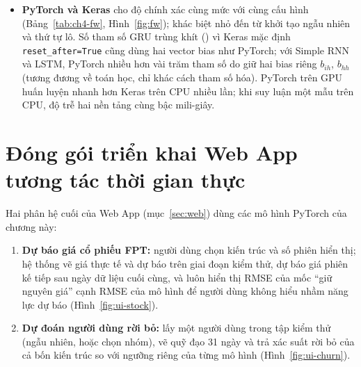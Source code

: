 \begin{itemize}
    (Bảng~\ref{tab:ch4-churn}); GRU tốt nhất với ROC-AUC  và AP , so với
     và  của Simple RNN (Hình~\ref{fig:roc-churn}). Mức tuyệt đối vẫn
    thấp: chỉ từ nhật ký nghe nhạc, người ở lại và người rời bỏ chồng lấn mạnh, đúng như EDA đã cảnh báo. Phân bố xác suất
    (Hình~\ref{fig:prob-churn}) cho thấy xác suất của nhóm rời bỏ chỉ dịch nhẹ sang phải so với nhóm ở lại. Ở ngưỡng tối ưu F1,
    mô hình chỉ bắt được khoảng một phần ba số người rời bỏ (Recall LSTM ) mà vẫn kèm nhiều báo
    động giả (Hình~\ref{fig:cm-churn}); nếu dùng để giữ chân khách hàng, danh sách xếp hạng theo xác suất hữu ích hơn một nhãn cứng.
  \item \textbf{PyTorch và Keras} cho độ chính xác cùng mức với cùng cấu hình (Bảng~\ref{tab:ch4-fw}, Hình~\ref{fig:fw});
    khác biệt nhỏ đến từ khởi tạo ngẫu nhiên và thứ tự lô. Số tham số GRU trùng khít () vì Keras
    mặc định \texttt{reset\_after=True} cũng dùng hai vector bias như PyTorch; với Simple RNN và LSTM, PyTorch nhiều hơn vài trăm
    tham số do giữ hai bias riêng $b_{ih}$, $b_{hh}$ (tương đương về toán học, chỉ khác cách tham số hóa). PyTorch trên GPU
    huấn luyện nhanh hơn Keras trên CPU nhiều lần; khi suy luận một mẫu trên CPU, độ trễ hai nền tảng cùng bậc mili-giây.
\end{itemize}

\section{Đóng gói triển khai Web App tương tác thời gian thực}

Hai phân hệ cuối của Web App (mục~\ref{sec:web}) dùng các mô hình PyTorch của chương này:
\begin{enumerate}
  \item \textbf{Dự báo giá cổ phiếu FPT:} người dùng chọn kiến trúc và số phiên hiển thị; hệ thống vẽ giá thực tế và dự báo
    trên giai đoạn kiểm thử, dự báo giá phiên kế tiếp sau ngày dữ liệu cuối cùng, và luôn hiển thị RMSE của mốc “giữ nguyên
    giá” cạnh RMSE của mô hình để người dùng không hiểu nhầm năng lực dự báo (Hình~\ref{fig:ui-stock}).
  \item \textbf{Dự đoán người dùng rời bỏ:} lấy một người dùng trong tập kiểm thử (ngẫu nhiên, hoặc chọn nhóm), vẽ quỹ đạo 31
    ngày và trả xác suất rời bỏ của cả bốn kiến trúc so với ngưỡng riêng của từng mô hình (Hình~\ref{fig:ui-churn}).
\end{enumerate}

